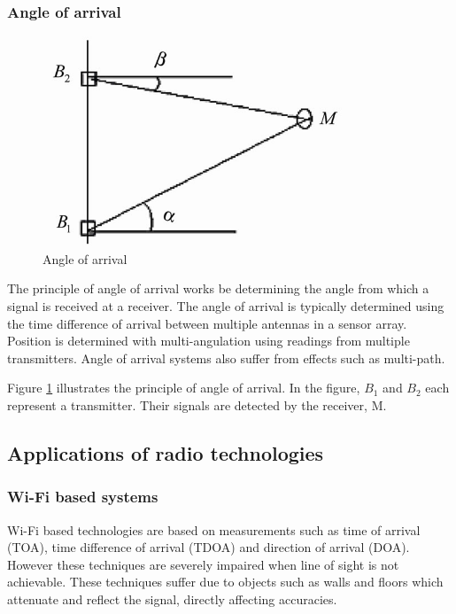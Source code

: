 \documentclass[11pt,a4paper]{report}
\begin{document}
		\subsubsection{Angle of arrival}
			\begin{figure}[H]
				\centering
				\includegraphics[width=0.8\textwidth]{angle_of_arrival}
				\caption{Angle of arrival}
				\label{fig:angle_of_arrival}
			\end{figure}
			The principle of angle of arrival works be determining the angle from which a signal is received at a receiver. The angle of arrival is typically determined using the time difference of arrival between multiple antennas in a sensor array. Position is determined with multi-angulation using readings from multiple transmitters.
			Angle of arrival systems also suffer from effects such as multi-path.
			
			Figure \ref{fig:angle_of_arrival} illustrates the principle of angle of arrival. In the figure, $B_1$ and $B_2$ each represent a transmitter. Their signals are detected by the receiver, M.
			
	\subsection{Applications of radio technologies}
		\subsubsection{Wi-Fi based systems}
			Wi-Fi based technologies are based on measurements such as time of arrival (TOA), time difference of arrival (TDOA) and direction of arrival (DOA). However these techniques are severely impaired when line of sight is not achievable. 
			These techniques suffer due to objects such as walls and floors which attenuate and reflect the signal, directly affecting accuracies.
		
\end{document}
